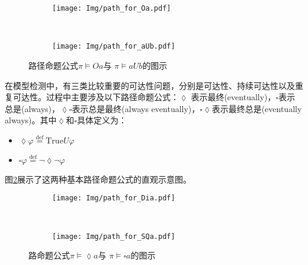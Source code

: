 \begin{figure}[!htbp]
    \centering
    \begin{subfigure}[b]{0.8\textwidth}
        \centering
        \texttt{[image: Img/path\_for\_Oa.pdf]}
    \end{subfigure}
    \\
    \begin{subfigure}{0.8\textwidth}
        \centering
        \texttt{[image: Img/path\_for\_aUb.pdf]}
    \end{subfigure}
    \caption{路径命题公式$\pi\models O a $与 $\pi\models a U b$的图示}
    \label{fig:path-formula-basic}
\end{figure}
在模型检测中，有三类比较重要的可达性问题，分别是可达性、持续可达性以及重复可达性。过程中主要涉及以下路径命题公式：\(\lozenge\) 表示最终(eventually)，\(\square\)表示总是(always)，\(\lozenge\square\)表示总是最终(always eventually)，\(\square\lozenge\)表示最终总是(eventually always)。其中\(\lozenge\)和\(\square\)具体定义为：
\begin{itemize}
    \item \(\lozenge\varphi\overset{\text{def} }{=} \text{True}U\varphi\)
    \item \(\square\varphi\overset{\text{def} }{=} \neg\lozenge\neg\varphi\)
\end{itemize}
图\ref{fig:path-formula}展示了这两种基本路径命题公式的直观示意图。
\begin{figure}[!htbp]
    \centering
    \begin{subfigure}[b]{0.8\textwidth}
        \centering
        \texttt{[image: Img/path\_for\_Dia.pdf]}
    \end{subfigure}
    \\
    \begin{subfigure}{0.8\textwidth}
        \centering
        \texttt{[image: Img/path\_for\_SQa.pdf]}
    \end{subfigure}
    \caption{路命题公式$\pi\models\lozenge a$与 $\pi\models\square a$的图示}
    \label{fig:path-formula}
\end{figure}

